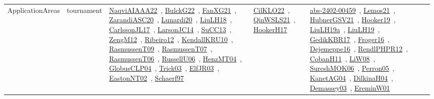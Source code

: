 {\begin{longtable}{lp{3cm}>{\raggedright\arraybackslash}p{6cm}>{\raggedright\arraybackslash}p{6cm}>{\raggedright\arraybackslash}p{8cm}}
\index{tournament}\index{ApplicationAreas!tournament}ApplicationAreas & tournament & \href{../works/NaqviAIAAA22.pdf}{NaqviAIAAA22}~\cite{NaqviAIAAA22}, \href{../works/BulckG22.pdf}{BulckG22}~\cite{BulckG22}, \href{../works/FanXG21.pdf}{FanXG21}~\cite{FanXG21}, \href{../works/ZarandiASC20.pdf}{ZarandiASC20}~\cite{ZarandiASC20}, \href{../works/Lunardi20.pdf}{Lunardi20}~\cite{Lunardi20}, \href{../works/LiuLH18.pdf}{LiuLH18}~\cite{LiuLH18}, \href{../works/CarlssonJL17.pdf}{CarlssonJL17}~\cite{CarlssonJL17}, \href{../works/LarsonJC14.pdf}{LarsonJC14}~\cite{LarsonJC14}, \href{../works/SuCC13.pdf}{SuCC13}~\cite{SuCC13}, \href{../works/ZengM12.pdf}{ZengM12}~\cite{ZengM12}, \href{../works/Ribeiro12.pdf}{Ribeiro12}~\cite{Ribeiro12}, \href{../works/KendallKRU10.pdf}{KendallKRU10}~\cite{KendallKRU10}, \href{../works/RasmussenT09.pdf}{RasmussenT09}~\cite{RasmussenT09}, \href{../works/RasmussenT07.pdf}{RasmussenT07}~\cite{RasmussenT07}, \href{../works/RasmussenT06.pdf}{RasmussenT06}~\cite{RasmussenT06}, \href{../works/RussellU06.pdf}{RussellU06}~\cite{RussellU06}, \href{../works/HenzMT04.pdf}{HenzMT04}~\cite{HenzMT04}, \href{../works/GlobusCLP04.pdf}{GlobusCLP04}~\cite{GlobusCLP04}, \href{../works/Trick03.pdf}{Trick03}~\cite{Trick03}, \href{../works/ElfJR03.pdf}{ElfJR03}~\cite{ElfJR03}, \href{../works/EastonNT02.pdf}{EastonNT02}~\cite{EastonNT02}, \href{../works/Schaerf97.pdf}{Schaerf97}~\cite{Schaerf97} & \href{../works/CilKLO22.pdf}{CilKLO22}~\cite{CilKLO22}, \href{../works/QinWSLS21.pdf}{QinWSLS21}~\cite{QinWSLS21}, \href{../works/HookerH17.pdf}{HookerH17}~\cite{HookerH17} & \href{../works/abs-2402-00459.pdf}{abs-2402-00459}~\cite{abs-2402-00459}, \href{../works/Lemos21.pdf}{Lemos21}~\cite{Lemos21}, \href{../works/HubnerGSV21.pdf}{HubnerGSV21}~\cite{HubnerGSV21}, \href{../works/Hooker19.pdf}{Hooker19}~\cite{Hooker19}, \href{../works/LiuLH19a.pdf}{LiuLH19a}~\cite{LiuLH19a}, \href{../works/LiuLH19.pdf}{LiuLH19}~\cite{LiuLH19}, \href{../works/GedikKBR17.pdf}{GedikKBR17}~\cite{GedikKBR17}, \href{../works/Froger16.pdf}{Froger16}~\cite{Froger16}, \href{../works/Dejemeppe16.pdf}{Dejemeppe16}~\cite{Dejemeppe16}, \href{../works/RendlPHPR12.pdf}{RendlPHPR12}~\cite{RendlPHPR12}, \href{../works/CobanH11.pdf}{CobanH11}~\cite{CobanH11}, \href{../works/LiW08.pdf}{LiW08}~\cite{LiW08}, \href{../works/SureshMOK06.pdf}{SureshMOK06}~\cite{SureshMOK06}, \href{../works/Perron05.pdf}{Perron05}~\cite{Perron05}, \href{../works/KanetAG04.pdf}{KanetAG04}~\cite{KanetAG04}, \href{../works/DilkinaH04.pdf}{DilkinaH04}~\cite{DilkinaH04}, \href{../works/Demassey03.pdf}{Demassey03}~\cite{Demassey03}, \href{../works/EreminW01.pdf}{EreminW01}~\cite{EreminW01}\\

\end{longtable}}
